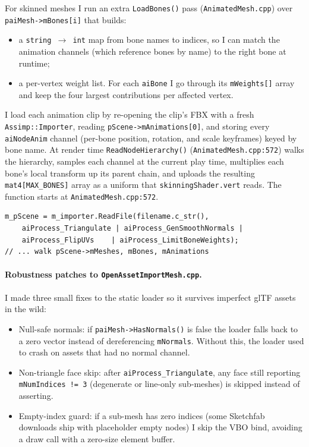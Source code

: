 \documentclass[11pt,a4paper]{article}
\begin{document}
For skinned meshes I run an extra \texttt{LoadBones()} pass
(\texttt{AnimatedMesh.cpp}) over \texttt{paiMesh->mBones[i]} that builds:
\begin{itemize}
  \item a \texttt{string $\to$ int} map from bone names to indices, so I
        can match the animation channels (which reference bones by name)
        to the right bone at runtime;
  \item a per-vertex weight list. For each \texttt{aiBone} I go through
        its \texttt{mWeights[]} array and keep the four largest
        contributions per affected vertex.
\end{itemize}
I load each animation clip by re-opening the clip's FBX with a fresh
\texttt{Assimp::Importer}, reading \texttt{pScene->mAnimations[0]}, and
storing every \texttt{aiNodeAnim} channel (per-bone position, rotation, and
scale keyframes) keyed by bone name. At render time
\texttt{ReadNodeHierarchy()} (\texttt{AnimatedMesh.cpp:572}) walks the
hierarchy, samples each channel at the current play time, multiplies each
bone's local transform up its parent chain, and uploads the resulting
\texttt{mat4[MAX\_BONES]} array as a uniform that
\texttt{skinningShader.vert} reads. The function starts at
\texttt{AnimatedMesh.cpp:572}.

\begin{lstlisting}[caption={Assimp import (animated path): core call}]
m_pScene = m_importer.ReadFile(filename.c_str(),
    aiProcess_Triangulate | aiProcess_GenSmoothNormals |
    aiProcess_FlipUVs    | aiProcess_LimitBoneWeights);
// ... walk pScene->mMeshes, mBones, mAnimations
\end{lstlisting}

\paragraph{Robustness patches to \texttt{OpenAssetImportMesh.cpp}.}
I made three small fixes to the static loader so it survives imperfect glTF
assets in the wild:
\begin{itemize}
  \item Null-safe normals: if \texttt{paiMesh->HasNormals()} is false the
        loader falls back to a zero vector instead of dereferencing
        \texttt{mNormals}. Without this, the loader used to crash on
        assets that had no normal channel.
  \item Non-triangle face skip: after \texttt{aiProcess\_Triangulate}, any
        face still reporting \texttt{mNumIndices != 3} (degenerate or
        line-only sub-meshes) is skipped instead of asserting.
  \item Empty-index guard: if a sub-mesh has zero indices (some Sketchfab
        downloads ship with placeholder empty nodes) I skip the VBO bind,
        avoiding a draw call with a zero-size element buffer.
\end{itemize}
\end{document}
